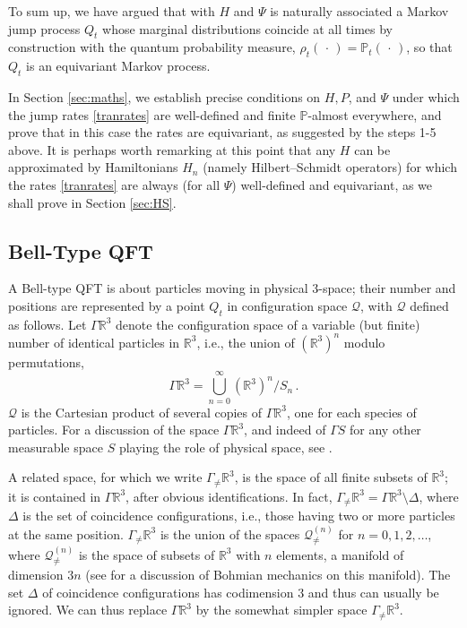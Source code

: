 \documentclass[12pt]{article}
\newcommand{\RRR}{\mathbb{R}} %
\newcommand{\1}{\mathbf{1}} %
\newcommand{\conf}{\mathcal{Q}} %
\newcommand{\measure}{\mathbb{P}} %
\newcommand{\pov}{{P}}%
\newcommand{\Gommo}{\Gamma_{\!\neq}} %
\begin{document}
To sum up, we have argued that with $H$ and $\Psi$ is naturally
associated a Markov jump process $Q_t$ whose marginal distributions
coincide at all times by construction with the quantum probability
measure, $\rho_t(\,\cdot\,) = \measure_t(\,\cdot\,)$, so that $Q_t$ is
an equivariant Markov process.

In Section \ref{sec:maths}, we establish precise conditions on
$H,\pov$, and $\Psi$ under which the jump rates \eqref{tranrates} are
well-defined and finite $\measure$-almost everywhere, and prove that
in this case the rates are equivariant, as suggested by the steps 1-5
above. It is perhaps worth remarking at this point that any $H$ can be
approximated by Hamiltonians $H_n$ (namely Hilbert--Schmidt operators)
for which the rates \eqref{tranrates} are always (for all $\Psi$)
well-defined and equivariant, as we shall prove in Section
\ref{sec:HS}.


\subsection{Bell-Type QFT}
\label{sec:2.6}\label{sec:BellQFT}

A Bell-type QFT is about particles moving in physical 3-space; their
number and positions are represented by a point $Q_t$ in configuration
space $\conf$, with $\conf$ defined as follows. Let $\Gamma \RRR^3$
denote the configuration space of a variable (but finite) number of
identical particles in $\RRR^3$, i.e., the union of $(\RRR^3)^n$
modulo permutations,
\begin{equation}
  \Gamma \RRR^3 = \bigcup_{n=0}^\infty (\RRR^3)^n /S_n \,.
\end{equation}
$\conf$ is the Cartesian product of several copies of $\Gamma \RRR^3$,
one for each species of particles. For a discussion of the space
$\Gamma \RRR^3$, and indeed of $\Gamma S$ for any other
measurable space $S$ playing the role of physical space, see
\cite[Sec.~2.8]{crea2B}.

A related space, for which we write $\Gommo \RRR^3$, is the space of
all finite subsets of $\RRR^3$; it is contained in $\Gamma \RRR^3$,
after obvious identifications. In fact, $\Gommo \RRR^3 = \Gamma \RRR^3
\setminus \Delta$, where $\Delta$ is the set of coincidence
configurations, i.e., those having two or more particles at the same
position.  $\Gommo \RRR^3$ is the union of the spaces
${\conf}^{(n)}_{\neq}$ for $n=0,1,2, \ldots$, where
${\conf}^{(n)}_{\neq}$ is the space of subsets of $\RRR^3$ with $n$
elements, a manifold of dimension $3n$ (see \cite{identical} for a
discussion of Bohmian mechanics on this manifold). The set $\Delta$ of
coincidence configurations has codimension $3$ and thus can usually be
ignored.  We can thus replace $\Gamma \RRR^3$ by the somewhat simpler
space $\Gommo \RRR^3$.
\end{document}
